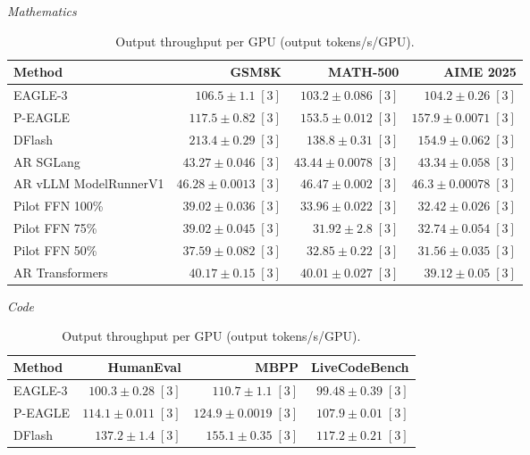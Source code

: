\begin{table}[!htp]
\centering\small
\setlength{\tabcolsep}{3pt}
\caption{Output throughput per GPU (output tokens/s/GPU).}
\label{tab:appendix-metric-per-gpu-throughput-none}
\textit{Mathematics}\par\smallskip
\begin{tabular}{@{}>{\raggedright\arraybackslash}p{3.7cm}rrr@{}}
\toprule
Method & GSM8K & MATH-500 & AIME 2025 \\
\midrule
EAGLE-3 & \(106.5 \pm 1.1\;[3]\) & \(103.2 \pm 0.086\;[3]\) & \(104.2 \pm 0.26\;[3]\) \\
P-EAGLE & \(117.5 \pm 0.82\;[3]\) & \(\mathbf{153.5} \pm 0.012\;[3]\) & \(\mathbf{157.9} \pm 0.0071\;[3]\) \\
DFlash & \(\mathbf{213.4} \pm 0.29\;[3]\) & \(138.8 \pm 0.31\;[3]\) & \(154.9 \pm 0.062\;[3]\) \\
AR \textperiodcentered{} SGLang & \(43.27 \pm 0.046\;[3]\) & \(43.44 \pm 0.0078\;[3]\) & \(43.34 \pm 0.058\;[3]\) \\
AR \textperiodcentered{} vLLM ModelRunnerV1 & \(46.28 \pm 0.0013\;[3]\) & \(46.47 \pm 0.002\;[3]\) & \(46.3 \pm 0.00078\;[3]\) \\
Pilot FFN 100\% & \(39.02 \pm 0.036\;[3]\) & \(33.96 \pm 0.022\;[3]\) & \(32.42 \pm 0.026\;[3]\) \\
Pilot FFN 75\% & \(39.02 \pm 0.045\;[3]\) & \(31.92 \pm 2.8\;[3]\) & \(32.74 \pm 0.054\;[3]\) \\
Pilot FFN 50\% & \(37.59 \pm 0.082\;[3]\) & \(32.85 \pm 0.22\;[3]\) & \(31.56 \pm 0.035\;[3]\) \\
AR \textperiodcentered{} Transformers & \(40.17 \pm 0.15\;[3]\) & \(40.01 \pm 0.027\;[3]\) & \(39.12 \pm 0.05\;[3]\) \\
\bottomrule
\end{tabular}\par\medskip
\textit{Code}\par\smallskip
\begin{tabular}{@{}>{\raggedright\arraybackslash}p{3.7cm}rrr@{}}
\toprule
Method & HumanEval & MBPP & LiveCodeBench \\
\midrule
EAGLE-3 & \(100.3 \pm 0.28\;[3]\) & \(110.7 \pm 1.1\;[3]\) & \(99.48 \pm 0.39\;[3]\) \\
P-EAGLE & \(114.1 \pm 0.011\;[3]\) & \(124.9 \pm 0.0019\;[3]\) & \(107.9 \pm 0.01\;[3]\) \\
DFlash & \(\mathbf{137.2} \pm 1.4\;[3]\) & \(\mathbf{155.1} \pm 0.35\;[3]\) & \(\mathbf{117.2} \pm 0.21\;[3]\) \\

\end{tabular}
\end{table}
